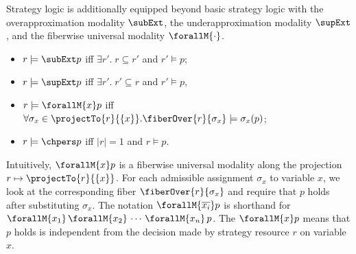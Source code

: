 \begin{definition}\label{def:strategy-logic-modalities} Strategy logic is additionally equipped beyond basic strategy logic with the overapproximation modality $\subExt$, the underapproximation modality $\supExt$, and the fiberwise universal modality $\forallM{\cdot}$.
  \begin{itemize}
    \item $r \models \subExt p$ iff $\exists r'.\; r \subseteq r'$ and
      $r' \models p$;
    \item $r \models \supExt p$ iff $\exists r'.\; r' \subseteq r$ and
      $r' \models p$,
    \item $r \models \forallM{x}p$ iff $\forall \sigma_x \in \projectTo{r}{\{x\}}. \fiberOver{r}{\sigma_x} \models \sigma_x(p)$;
    \item $r \models \chpers p$ iff $|r| = 1$ and $r \models p$.
    \end{itemize}
\end{definition}

Intuitively, $\forallM{x}p$ is a fiberwise universal modality along the projection
$r \mapsto \projectTo{r}{\{x\}}$.
For each admissible assignment $\sigma_x$ to variable $x$, we look at the
corresponding fiber $\fiberOver{r}{\sigma_x}$ and require that $p$ holds after
substituting $\sigma_x$.
The notation $\forallM{\overline{x_i}} p$ is shorthand for
$\forallM{x_1}\,\forallM{x_2}\,\cdots\,\forallM{x_n}\,p$. The $\forallM{x}p$ means that $p$ holds is independent from the decision made by strategy resource $r$ on variable $x$.



